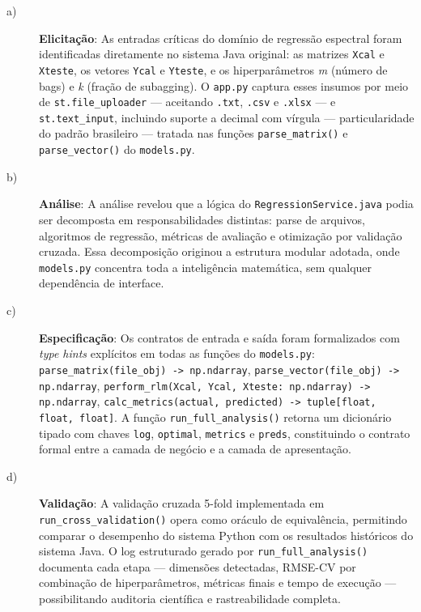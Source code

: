 \begin{description}

\item[a)] \textbf{Elicitação}: As entradas críticas do domínio de regressão espectral foram
identificadas diretamente no sistema Java original: as matrizes \texttt{Xcal} e
\texttt{Xteste}, os vetores \texttt{Ycal} e \texttt{Yteste}, e os hiperparâmetros
\textit{m} (número de bags) e \textit{k} (fração de subagging). O \texttt{app.py}
captura esses insumos por meio de \texttt{st.file\_uploader} — aceitando \texttt{.txt},
\texttt{.csv} e \texttt{.xlsx} — e \texttt{st.text\_input}, incluindo suporte a decimal
com vírgula — particularidade do padrão brasileiro — tratada nas funções
\texttt{parse\_matrix()} e \texttt{parse\_vector()} do \texttt{models.py}.

\item[b)] \textbf{Análise}: A análise revelou que a lógica do \texttt{RegressionService.java}
podia ser decomposta em responsabilidades distintas: parse de arquivos, algoritmos de
regressão, métricas de avaliação e otimização por validação cruzada. Essa decomposição
originou a estrutura modular adotada, onde \texttt{models.py} concentra toda a
inteligência matemática, sem qualquer dependência de interface.

\item[c)] \textbf{Especificação}: Os contratos de entrada e saída foram formalizados com
\textit{type hints} explícitos em todas as funções do \texttt{models.py}:
\texttt{parse\_matrix(file\_obj) -> np.ndarray},
\texttt{parse\_vector(file\_obj) -> np.ndarray},
\texttt{perform\_rlm(Xcal, Ycal, Xteste: np.ndarray) -> np.ndarray},
\texttt{calc\_metrics(actual, predicted) -> tuple[float, float, float]}.
A função \texttt{run\_full\_analysis()} retorna um dicionário tipado com chaves
\texttt{log}, \texttt{optimal}, \texttt{metrics} e \texttt{preds}, constituindo o
contrato formal entre a camada de negócio e a camada de apresentação.

\item[d)] \textbf{Validação}: A validação cruzada 5-fold implementada em
\texttt{run\_cross\_validation()} opera como oráculo de equivalência, permitindo comparar
o desempenho do sistema Python com os resultados históricos do sistema Java. O log
estruturado gerado por \texttt{run\_full\_analysis()} documenta cada etapa — dimensões
detectadas, RMSE-CV por combinação de hiperparâmetros, métricas finais e tempo de
execução — possibilitando auditoria científica e rastreabilidade completa.

\end{description}

